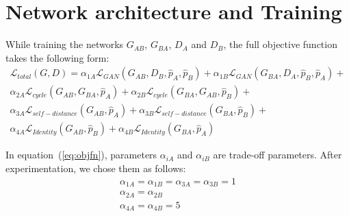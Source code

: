\section {Network architecture and Training}
While training the networks $G_{AB}$, $G_{BA}$, $D_{A}$ and $D_{B}$, the full objective function takes the following form:
\begin{equation}
\begin{split}
\mathcal L_{total}(G,D)=\alpha_{1A}\mathcal L_{GAN}(G_{AB},D_{B},\hat{p}_A,\hat{p}_B)+\alpha_{1B}\mathcal L_{GAN}(G_{BA},D_{A},\hat{p}_B,\hat{p}_A)+\\ 
\alpha_{2A}\mathcal L_{cycle}(G_{AB},G_{BA},\hat{p}_A)+\alpha_{2B}\mathcal L_{cycle}(G_{BA},G_{AB},\hat{p}_B)+\\
\alpha_{3A}\mathcal L_{self-distance}(G_{AB},\hat{p}_A)+\alpha_{3B}\mathcal L_{self-distance}(G_{BA},\hat{p}_B)+\\ 
\alpha_{4A}\mathcal L_{Identity}(G_{AB},\hat{p}_B)+\alpha_{4B}\mathcal L_{Identity}(G_{BA},\hat{p}_A)
\end{split}
\label{eq:objfn}
\end{equation}

In equation~(\ref{eq:objfn}), parameters $\alpha_{iA}$ and $\alpha_{iB}$ are trade-off parameters. After experimentation, we chose them as follows:
\begin{eqnarray}
\alpha_{1A}=\alpha_{1B}=\alpha_{3A}=\alpha_{3B}=1 \\
\alpha_{2A}=\alpha_{2B}\\
\alpha_{4A}=\alpha_{4B}=5 
\label{eq:tradeoff}
\end{eqnarray}
 
